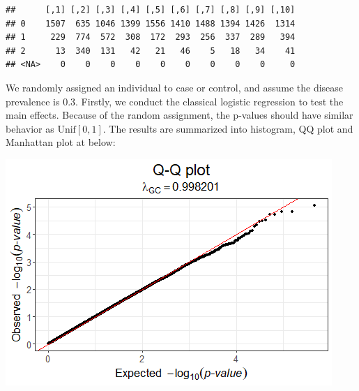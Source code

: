\documentclass[
]{article}
\newenvironment{Shaded}{\begin{snugshade}}{\end{snugshade}}
\newcommand{\CommentTok}[1]{\textcolor[rgb]{0.56,0.35,0.01}{\textit{#1}}}
\newcommand{\DataTypeTok}[1]{\textcolor[rgb]{0.13,0.29,0.53}{#1}}
\newcommand{\DecValTok}[1]{\textcolor[rgb]{0.00,0.00,0.81}{#1}}
\newcommand{\FloatTok}[1]{\textcolor[rgb]{0.00,0.00,0.81}{#1}}
\newcommand{\KeywordTok}[1]{\textcolor[rgb]{0.13,0.29,0.53}{\textbf{#1}}}
\newcommand{\NormalTok}[1]{#1}
\newcommand{\OperatorTok}[1]{\textcolor[rgb]{0.81,0.36,0.00}{\textbf{#1}}}
\newcommand{\StringTok}[1]{\textcolor[rgb]{0.31,0.60,0.02}{#1}}
\begin{document}
\begin{verbatim}
##      [,1] [,2] [,3] [,4] [,5] [,6] [,7] [,8] [,9] [,10]
## 0    1507  635 1046 1399 1556 1410 1488 1394 1426  1314
## 1     229  774  572  308  172  293  256  337  289   394
## 2      13  340  131   42   21   46    5   18   34    41
## <NA>    0    0    0    0    0    0    0    0    0     0
\end{verbatim}

We randomly assigned an individual to case or control, and assume the
disease prevalence is 0.3. Firstly, we conduct the classical logistic
regression to test the main effects. Because of the random assignment,
the p-values should have similar behavior as \(\text{Unif}[0,1]\). The
results are summarized into histogram, QQ plot and Manhattan plot at
below:

\begin{Shaded}
\end{Shaded}

\includegraphics{stats-gene-research-progress-v9_files/figure-latex/unnamed-chunk-2-1.png}
\end{document}
